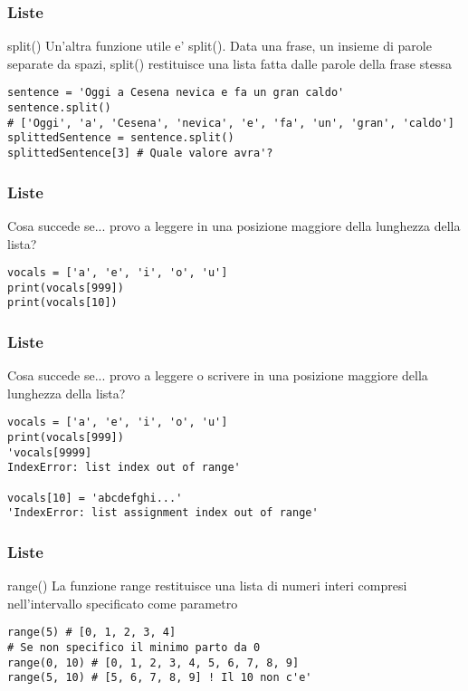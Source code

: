 \begin{frame}[fragile]
\frametitle{Liste}
    \begin{block}{split()}
Un'altra funzione utile e' split().
Data una frase, un insieme di parole separate da spazi, split() restituisce una lista fatta dalle parole della frase stessa
    \end{block}
    
    \begin{lstlisting}
sentence = 'Oggi a Cesena nevica e fa un gran caldo'
sentence.split()
# ['Oggi', 'a', 'Cesena', 'nevica', 'e', 'fa', 'un', 'gran', 'caldo']
splittedSentence = sentence.split()
splittedSentence[3] # Quale valore avra'?
    \end{lstlisting}

\end{frame}

\begin{frame}[fragile]
\frametitle{Liste}
    \begin{block}{Cosa succede se...}
provo a leggere in una posizione maggiore della lunghezza della lista?
    \end{block}
    
    \begin{lstlisting}
vocals = ['a', 'e', 'i', 'o', 'u']
print(vocals[999])
print(vocals[10])
    \end{lstlisting}

\end{frame}

\begin{frame}[fragile]
\frametitle{Liste}
    \begin{block}{Cosa succede se...}
provo a leggere o scrivere in una posizione maggiore della lunghezza della lista?
    \end{block}
    
    \begin{lstlisting}
vocals = ['a', 'e', 'i', 'o', 'u']
print(vocals[999])
'vocals[9999]
IndexError: list index out of range'

vocals[10] = 'abcdefghi...'
'IndexError: list assignment index out of range'
    \end{lstlisting}
\end{frame}

\begin{frame}[fragile]
\frametitle{Liste}
    \begin{block}{range()}
    La funzione range restituisce una lista di numeri interi compresi nell'intervallo specificato come parametro
    \end{block}
    
    \begin{lstlisting}
range(5) # [0, 1, 2, 3, 4]
# Se non specifico il minimo parto da 0    
range(0, 10) # [0, 1, 2, 3, 4, 5, 6, 7, 8, 9]
range(5, 10) # [5, 6, 7, 8, 9] ! Il 10 non c'e'
    \end{lstlisting}
\end{frame}

